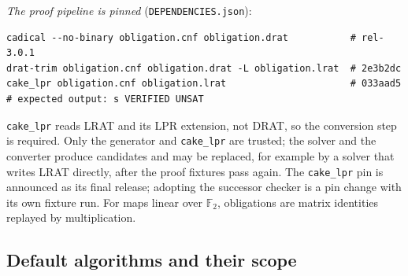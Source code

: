 \documentclass[11pt]{article}
\newcommand{\code}[1]{\texttt{#1}}
\newcommand{\F}{\mathbb{F}}
\begin{document}
\emph{The proof pipeline is pinned} (\code{DEPENDENCIES.json}):
\begin{lstlisting}
cadical --no-binary obligation.cnf obligation.drat           # rel-3.0.1
drat-trim obligation.cnf obligation.drat -L obligation.lrat  # 2e3b2dc
cake_lpr obligation.cnf obligation.lrat                      # 033aad5
# expected output: s VERIFIED UNSAT
\end{lstlisting}
\code{cake\_lpr} reads LRAT and its LPR extension, not DRAT, so the conversion step is required. Only
the generator and \code{cake\_lpr} are trusted; the solver and the converter produce candidates and
may be replaced, for example by a solver that writes LRAT directly, after the proof fixtures pass
again. The \code{cake\_lpr} pin is announced as its final release; adopting the successor checker is a
pin change with its own fixture run. For maps linear over $\F_2$, obligations are matrix identities
replayed by multiplication.

\subsection{Default algorithms and their scope}\label{sec:algorithms}
\end{document}
